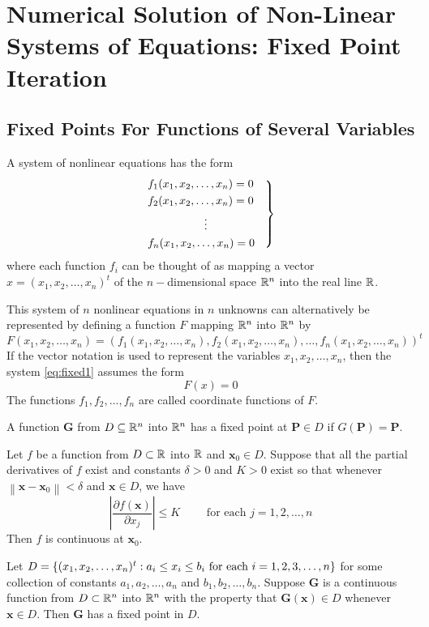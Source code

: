\documentclass[../main-sheet.tex]{subfiles}
\begin{document}
\chapter{Numerical Solution of Non-Linear Systems of Equations: Fixed Point Iteration}
\section{Fixed Points For Functions of Several Variables}
A system of nonlinear equations has the form
\begin{equation}
    \begin{rcases}
        f_1(x_1,x_2,\dots, x_n)=0\quad\\
    f_2(x_1,x_2,\dots, x_n)=0\\
    \qquad\quad \qquad\vdots \\
    f_n(x_1,x_2,\dots, x_n)=0    
    \end{rcases}
    \label{eq:fixed1}
\end{equation}
where each function \(f_i\) can be thought of as mapping a vector \(x=(x_1, x_2, \dots, x_n)^t\) of the \(n-\)dimensional space \(\mathbb{R}^n\) into the real line \(\mathbb{R}\).

This system of \(n\) nonlinear equations in \(n\) unknowns can alternatively be represented by defining a function \(F\) mapping \(\mathbb{R}^n\) into \(\mathbb{R}^n\) by
\[
    F(x_1,x_2,\dots,x_n)=\left( f_1(x_1,x_2,\dots,x_n), f_2(x_1,x_2,\dots,x_n),\dots,f_n(x_1,x_2,\dots,x_n) \right)^t
\]
If the vector notation is used to represent the variables \(x_1,x_2,\dots,x_n\), then the system \eqref{eq:fixed1} assumes the form
\[F(x)=0\]
The functions \(f_1,f_2,\dots,f_n\) are called coordinate functions of \(F\).
\begin{defn}
    A function \(\mathbf{G} \) from \(D\subseteq \mathbb{R}^n\) into \(\mathbb{R}^n\) has a fixed point at \(\mathbf{P}\in D\) if \(G(\mathbf{P})=\mathbf{P}\).
\end{defn}
\begin{thm}
    \label{thm:fixedA}
    Let \(f\) be a function from \(D\subset \mathbb{R}\) into \(\mathbb{R}\) and \(\mathbf{x}_0\in D\). Suppose that all the partial derivatives
    of \(f\) exist and constants \(\delta>0\) and \(K>0\) exist so that whenever \(\left\|\mathbf{x}-\mathbf{x}_0\right\|<\delta\) and \(\mathbf{x}\in D\),
    we have
    \[
        \left\vert\frac{\partial f(\mathbf{x})}{\partial x_j}\right\vert\leq K \qquad \text{ for each } j=1,2,\dots,n
        \]
        Then \(f\) is continuous at \(\mathbf{x}_0\).
    \end{thm}
\begin{thm}
    \label{thm:fixedB}
    Let \(D=\left\{(x_1,x_2,\dots,x_n)^t:a_i\leq x_i\leq b_i \text{ for each }i=1,2,3,\dots,n\right\}\) for some collection of constants \(a_1,a_2,\dots,a_n\) and \(b_1,b_2,\dots,b_n\). Suppose \(\mathbf{G}\) is a continuous function from \(D\subset \mathbb{R}^n\) into \(\mathbb{R}^n\) with the property that \(\mathbf{G}(\mathbf{x})\in D\) whenever \(\mathbf{x}\in D\). Then \(\mathbf{G}\) has a fixed point in \(D\).
\end{thm}
\end{document}
